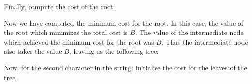 \documentclass[10pt,\jkfside,a4paper]{article}
\begin{document}
\begin{enumerate}
\begin{figure}[H]
\begin{tikzpicture}
        \end{tikzpicture}

    \end{figure}

    Finally, compute the cost of the root:

    \begin{figure}[H]

        \centering


    \end{figure}

    Now we have computed the minimum cost for the root. In this case, the value of the root which minimizes the total cost is $B$. The value of the intermediate node which achieved the minimum cost for the root
    was $B$. Thus the intermediate node also takes the value $B$, leaving us the following tree:

    \begin{figure}[H]

        \centering


    \end{figure}

    Now, for the second character in the string: initialise the cost for the leaves of the tree.

    \begin{figure}[H]


\end{figure}
\end{enumerate}
\end{document}
